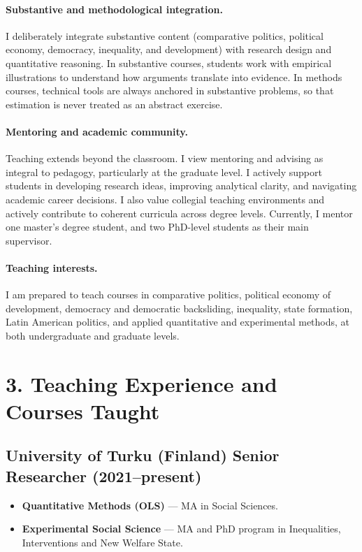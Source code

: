\documentclass[letterpaper,11pt]{article}
\begin{document}
\paragraph{Substantive and methodological integration.}
I deliberately integrate substantive content (comparative politics, political economy, democracy, inequality, and development) with research design and quantitative reasoning. In substantive courses, students work with empirical illustrations to understand how arguments translate into evidence. In methods courses, technical tools are always anchored in substantive problems, so that estimation is never treated as an abstract exercise.

\paragraph{Mentoring and academic community.}
Teaching extends beyond the classroom. I view mentoring and advising as integral to pedagogy, particularly at the graduate level. I actively support students in developing research ideas, improving analytical clarity, and navigating academic career decisions. I also value collegial teaching environments and actively contribute to coherent curricula across degree levels. Currently, I mentor one master's degree student, and two PhD-level students as their main supervisor.

\paragraph{Teaching interests.}
I am prepared to teach courses in comparative politics, political economy of development, democracy and democratic backsliding, inequality, state formation, Latin American politics, and applied quantitative and experimental methods, at both undergraduate and graduate levels.

\section*{3. Teaching Experience and Courses Taught}

\subsection*{University of Turku (Finland) \hfill Senior Researcher (2021--present)}
\begin{itemize}
  \item \textbf{Quantitative Methods (OLS)} --- MA in Social Sciences.
  \item \textbf{Experimental Social Science} --- MA and PhD program in Inequalities, Interventions and New Welfare State.
\end{itemize}
\end{document}
